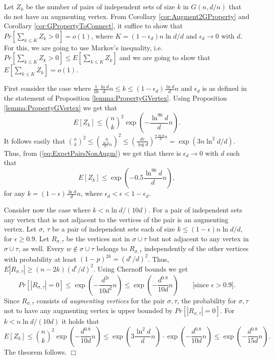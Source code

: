\documentclass[a4paper,10pt]{article}
\makeatletter
\newenvironment{theoremproof}[1]{\noindent{\bf Proof of Theorem #1\@:}}{\hfill $\Box$\\}
\makeatother
\begin{document}
\begin{theoremproof}{\ref{thrm:ConnectivityGnp}}
Let $Z_k$ be the number of pairs of independent sets of size $k$
in $G(n,d/n)$  that do not have an augmenting vertex. From Corollary
\ref{cor:Augment2GProperty} and Corollary \ref{cor:GPropertyToConnect},
it suffice to show that $Pr\left[\sum_{k\leq K}Z_{k}>0\right]=o(1)$,
where $K=(1-\epsilon_d)n\ln d/d$ and $\epsilon_d\to 0$ with $d$.
For this, we are going to use Markov's inequality, i.e.
$Pr\left[\sum_{k\leq K}Z_{k}>0\right]\leq E\left[\sum_{k\leq K} Z_{k}\right]$
and we are going to show that $E\left[\sum_{k\leq K} Z_{k}\right]=o(1)$.


First consider the case where $\frac{1}{10}\frac{\ln d}{d}n\leq k\leq (1-\epsilon_d)\frac{\ln d}{d}n$
and $\epsilon_d$ is as defined in the statement of Proposition \ref{lemma:PropertyGVertex}.
Using Proposition \ref{lemma:PropertyGVertex} we get that 
\begin{equation}\label{eq:ExpctPairsNonAugm}
E[Z_{k}]\leq  \displaystyle {n \choose k}^2\exp \left(-\frac{\ln^{90}d}{d}n\right).
\end{equation}
It follows easily that
${n \choose k}^2\leq {n \choose \frac{\ln d}{d}n}^2\leq  \left(\frac{de}{\log d}\right)^{2\frac{\ln d}{d}n}=\exp\left( 3n\ln^2 d/d\right).$
Thus, from (\ref{eq:ExpctPairsNonAugm}) we get that there is 
$\epsilon_d\to 0$ with $d$ such that 
$$
E[Z_k]\leq \exp\left(-0.5\frac{\ln^{90}d}{d}n \right),
$$
for any $k=(1-\epsilon)\frac{\ln d}{d}n$, where $\epsilon_d<\epsilon<1-\epsilon_d$.

Consider now the case where $k<n\ln d/(10d)$. For a pair of independent
sets any vertex that is not adjacent to the vertices of the pair is an
augmenting vertex. Let $\sigma$, $\tau$ be a pair of independent sets
each of size $k\leq(1-\epsilon) n \ln d/d$, for $\epsilon\geq 0.9$. 
Let $R_{\sigma,\tau}$ be the vertices not in $\sigma\cup \tau$ but 
not adjacent to any vertex in $\sigma \cup \tau$, as well.
Every $w\notin \sigma\cup\tau$  belongs to $R_{\sigma,\tau}$ independently of the
other vertices with probability at least  $(1-p)^{2k}=\left(d^{\epsilon}/d \right)^2$.
Thus, $E|R_{\sigma,\tau}|\geq (n-2k)(d^{\epsilon}/d)^2$. Using Chernoff bounds 
we get
\begin{displaymath}
Pr[|R_{\sigma,\tau}|=0]\leq \exp\left( -\frac{d^{2\epsilon}}{10d^2}n \right)\leq
\exp\left( -\frac{d^{0.8}}{10d}n \right) \qquad \mbox{[since $\epsilon>0.9$]}.
\end{displaymath}
Since $R_{\sigma,\tau}$ consists of {\em augmenting vertices} for
the pair $\sigma,\tau$, the probability for $\sigma,\tau $ not to 
have any  augmenting vertex is upper bounded by $Pr[|R_{\sigma,\tau}|=0]$.
For  $k<n\ln d/(10d)$ it holds that
\begin{displaymath}
E[Z_k]\leq {n \choose k}^2\exp\left( -\frac{d^{0.8}}{10d}n \right)\leq
\exp\left(3\frac{\ln^2 d}{d}n \right)\cdot \exp\left( -\frac{d^{0.8}}{10d}n \right)
\leq \exp\left( -\frac{d^{0.8}}{15d}n \right).
\end{displaymath}
The theorem follows.
\end{theoremproof}
\end{document}
